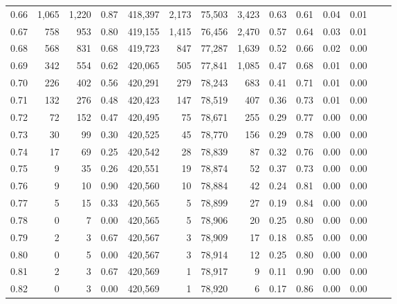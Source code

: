 \begin{tabular}{rrrrrrrrrrrrrr}
0.66 &   1,065 &  1,220 &    0.87 &  418,397 &    2,173 &  75,503 &   3,423 &  0.63 &  0.61 &  0.04 &      0.01 \\
0.67 &     758 &    953 &    0.80 &  419,155 &    1,415 &  76,456 &   2,470 &  0.57 &  0.64 &  0.03 &      0.01 \\
0.68 &     568 &    831 &    0.68 &  419,723 &      847 &  77,287 &   1,639 &  0.52 &  0.66 &  0.02 &      0.00 \\
0.69 &     342 &    554 &    0.62 &  420,065 &      505 &  77,841 &   1,085 &  0.47 &  0.68 &  0.01 &      0.00 \\
0.70 &     226 &    402 &    0.56 &  420,291 &      279 &  78,243 &     683 &  0.41 &  0.71 &  0.01 &      0.00 \\
0.71 &     132 &    276 &    0.48 &  420,423 &      147 &  78,519 &     407 &  0.36 &  0.73 &  0.01 &      0.00 \\
0.72 &      72 &    152 &    0.47 &  420,495 &       75 &  78,671 &     255 &  0.29 &  0.77 &  0.00 &      0.00 \\
0.73 &      30 &     99 &    0.30 &  420,525 &       45 &  78,770 &     156 &  0.29 &  0.78 &  0.00 &      0.00 \\
0.74 &      17 &     69 &    0.25 &  420,542 &       28 &  78,839 &      87 &  0.32 &  0.76 &  0.00 &      0.00 \\
0.75 &       9 &     35 &    0.26 &  420,551 &       19 &  78,874 &      52 &  0.37 &  0.73 &  0.00 &      0.00 \\
0.76 &       9 &     10 &    0.90 &  420,560 &       10 &  78,884 &      42 &  0.24 &  0.81 &  0.00 &      0.00 \\
0.77 &       5 &     15 &    0.33 &  420,565 &        5 &  78,899 &      27 &  0.19 &  0.84 &  0.00 &      0.00 \\
0.78 &       0 &      7 &    0.00 &  420,565 &        5 &  78,906 &      20 &  0.25 &  0.80 &  0.00 &      0.00 \\
0.79 &       2 &      3 &    0.67 &  420,567 &        3 &  78,909 &      17 &  0.18 &  0.85 &  0.00 &      0.00 \\
0.80 &       0 &      5 &    0.00 &  420,567 &        3 &  78,914 &      12 &  0.25 &  0.80 &  0.00 &      0.00 \\
0.81 &       2 &      3 &    0.67 &  420,569 &        1 &  78,917 &       9 &  0.11 &  0.90 &  0.00 &      0.00 \\
0.82 &       0 &      3 &    0.00 &  420,569 &        1 &  78,920 &       6 &  0.17 &  0.86 &  0.00 &      0.00 \\

\end{tabular}

